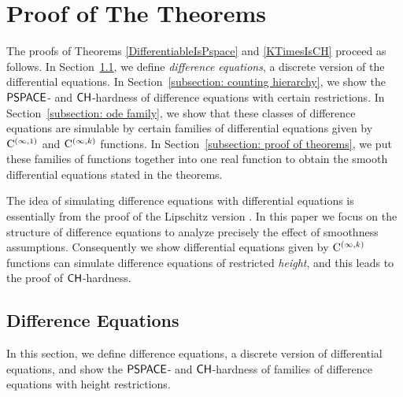\section{Proof of The Theorems}
\label{section:differentiable}

The proofs of Theorems \ref{DifferentiableIsPspace} and \ref{KTimesIsCH}
proceed as follows. 
In Section~\ref{section:divp}, 
we define \emph{difference equations}, 
a discrete version of the differential equations. 
In Section~\ref{subsection: counting hierarchy}, 
we show the $\mathsf{PSPACE}$- and $\mathsf{CH}$-hardness of 
difference equations with certain restrictions. 
In Section~\ref{subsection: ode family}, 
we show that these classes of difference equations are simulable 
by certain families of differential equations
given by $\mathrm C ^{(\infty, 1)}$ and $\mathrm C ^{(\infty, k)}$ functions. 
In Section~\ref{subsection: proof of theorems}, 
we put these families of functions together into one real function
to obtain the smooth differential equations stated in the theorems. 

The idea of simulating difference equations with differential equations
is essentially from the proof of 
the Lipschitz version \cite{kawamura2010lipschitz}.
In this paper we focus on the structure of difference equations
to analyze precisely the effect of smoothness assumptions.
Consequently we show differential equations 
given by $\mathrm C ^{(\infty, k)}$ functions
can simulate difference equations of restricted \emph{height}, 
and this leads to the proof of $\mathsf{CH}$-hardness.

\subsection{Difference Equations}
\label{section:divp}

In this section, we define difference equations, 
a discrete version of differential equations,
and show the $\mathsf{PSPACE}$- and $\mathsf{CH}$-hardness of 
families of difference equations with height restrictions. 

